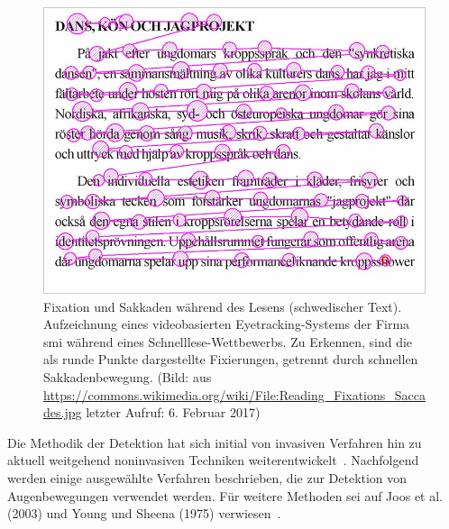 \begin{figure}[ht]
   \begin{minipage}[b]{\linewidth} 
      \centering 
\includegraphics[scale=3]{bilder/grundlagen/sakkaden.jpg}
   \end{minipage}%
   \hfill
   \caption{Fixation und Sakkaden während des Lesens (schwedischer Text). Aufzeichnung eines videobasierten Eyetracking-Systems der Firma \acs{smi} während eines Schnelllese-Wettbewerbs. Zu Erkennen, sind die als runde Punkte dargestellte Fixierungen, getrennt durch schnellen Sakkadenbewegung. (Bild: aus \url{https://commons.wikimedia.org/wiki/File:Reading_Fixations_Saccades.jpg} letzter Aufruf: 6. Februar 2017)}\label{fig:sakkad} 
\end{figure}

Die Methodik der Detektion hat sich initial von invasiven Verfahren hin zu aktuell weitgehend noninvasiven Techniken weiterentwickelt~\cite{Joos2003,Lupu2013}. Nachfolgend werden einige ausgewählte Verfahren beschrieben, die zur Detektion von Augenbewegungen verwendet werden.  Für weitere Methoden sei auf Joos et al. (2003) und Young und Sheena (1975) verwiesen~\cite{Joos2003, Young1975}.

